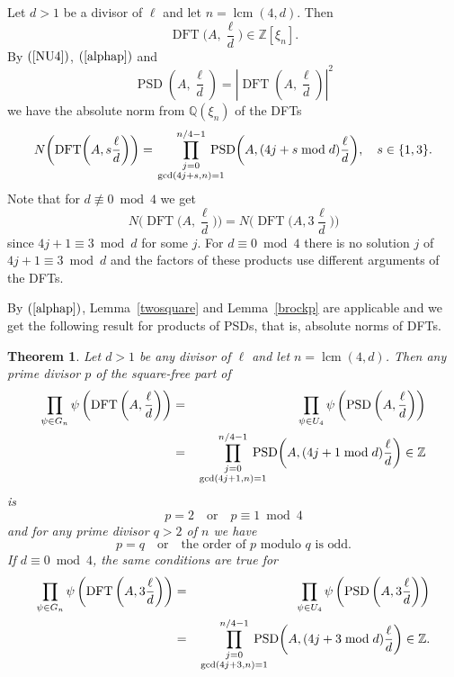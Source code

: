 \documentclass{article}
\newtheorem{theorem}{Theorem}
\theoremstyle{definition}
\newcommand{\DFT}{\operatorname{DFT}}
\newcommand{\PSD}{\operatorname{PSD}}
\newcommand{\lcm}{\operatorname{lcm}}
\begin{document}
Let $d>1$ be a divisor of $\ell$ and let $n=\lcm(4,d)$.
Then
$$\DFT\biggl(A,\frac{\ell}{d}\biggr)\in \mathbb{Z}[\xi_n].$$
%
%
%
By $(\ref{NU4})$, $(\ref{alphap})$ and 
$$\PSD\left(A,\frac{\ell}{d}\right)=\left|\DFT\left(A,\frac{\ell}{d}\right)\right|^2$$
we have the absolute norm from $\mathbb{Q}(\xi_n)$ of the DFTs
$$N\biggl(\DFT\biggl(A,s\frac{\ell}{d}\biggr)\biggr)=\prod_{\textstyle\genfrac{}{}{0pt}{}{j=0}{\gcd(4j+s,n)=1}}^{n/4-1}\kern-14pt\PSD\biggl(A,(4j+s\bmod d)\frac{\ell}{d}\biggr),\quad s\in \{1,3\}.$$
Note that for $d\not\equiv 0\bmod 4$ we get
$$N\biggl(\DFT\biggl(A,\frac{\ell}{d}\biggr)\biggr)=N\biggl(\DFT\biggl(A,3\frac{\ell}{d}\biggr)\biggr)$$
since $4j+1\equiv 3\bmod d$ for some $j$. For $d\equiv 0\bmod 4$ there is no solution $j$ of $4j+1\equiv 3\bmod d$ and the factors of these products use different arguments of the DFTs.

By $(\ref{alphap})$, Lemma~\ref{twosquare} and Lemma~\ref{brockp} are applicable and we get the following result for products of PSDs, that is, absolute norms of DFTs.


\begin{theorem}\label{prodcond}
Let $d>1$ be any divisor of $\ell$ and let $n=\lcm(4,d)$.
Then any prime divisor $p$ of the square-free part of  
\begin{eqnarray*}    
\prod_{\psi\in G_n}\psi\left(\DFT\left(A,\frac{\ell}{d}\right)\right)&=&\prod_{\psi \in U_4}\psi\left(\PSD\left(A,\frac{\ell}{d}\right)\right)\\&=&\prod_{\textstyle\genfrac{}{}{0pt}{}{j=0}{\gcd(4j+1,n)=1}}^{n/4-1}\kern-14pt\PSD\biggl(A,(4j+1\bmod d)\frac{\ell}{d}\biggr)\in \mathbb{Z}
\end{eqnarray*}
is 
$$p=2 \quad \mbox{or}\quad p\equiv 1 \bmod 4$$
and for any prime divisor $q>2$ of $n$ we have
$$p=q\quad \mbox{or}\quad \mbox{the order of $p$ modulo $q$ is odd}.$$%
If $d\equiv 0\bmod 4$, the same conditions are true for
\begin{eqnarray*}\prod_{\psi\in G_n}\psi\left(\DFT\left(A,3\frac{\ell}{d}\right)\right)&=& 
\prod_{\psi\in U_4}\psi\left(\PSD\left(A,3\frac{\ell}{d}\right)\right)\\
&=&\prod_{\textstyle\genfrac{}{}{0pt}{}{j=0}{\gcd(4j+3,n)=1}}^{n/4-1}\kern-14pt\PSD\biggl(A,(4j+3\bmod d)\frac{\ell}{d}\biggr)\in \mathbb{Z}.
\end{eqnarray*}
\end{theorem}
\end{document}
